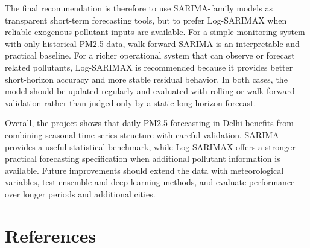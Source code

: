 \documentclass[11pt]{article}
\begin{document}
The final recommendation is therefore to use SARIMA-family models as transparent short-term forecasting tools, but to prefer Log-SARIMAX when reliable exogenous pollutant inputs are available. For a simple monitoring system with only historical PM2.5 data, walk-forward SARIMA is an interpretable and practical baseline. For a richer operational system that can observe or forecast related pollutants, Log-SARIMAX is recommended because it provides better short-horizon accuracy and more stable residual behavior. In both cases, the model should be updated regularly and evaluated with rolling or walk-forward validation rather than judged only by a static long-horizon forecast.

Overall, the project shows that daily PM2.5 forecasting in Delhi benefits from combining seasonal time-series structure with careful validation. SARIMA provides a useful statistical benchmark, while Log-SARIMAX offers a stronger practical forecasting specification when additional pollutant information is available. Future improvements should extend the data with meteorological variables, test ensemble and deep-learning methods, and evaluate performance over longer periods and additional cities.


\section*{References}
\end{document}
